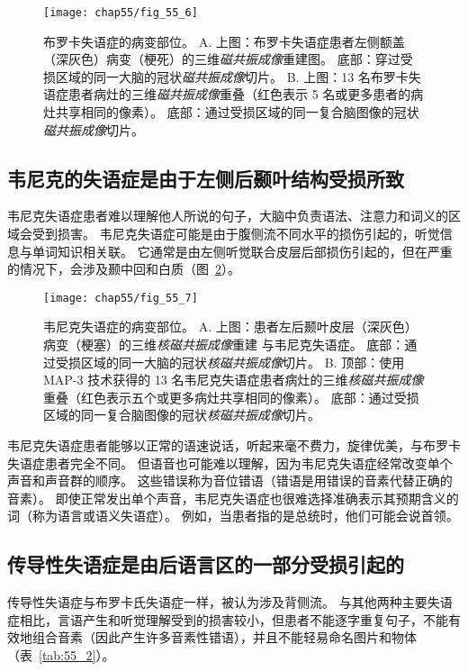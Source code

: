 \begin{figure}[htbp]
	\centering
	\texttt{[image: chap55/fig\_55\_6]}
	\caption{布罗卡失语症的病变部位。
		A. 上图：布罗卡失语症患者左侧额盖（深灰色）病变（梗死）的三维\textit{磁共振成像}重建图。
		底部：穿过受损区域的同一大脑的冠状\textit{磁共振成像}切片。
		B. 上图：13 名布罗卡失语症患者病灶的三维\textit{磁共振成像}重叠（红色表示 5 名或更多患者的病灶共享相同的像素）。
		底部：通过受损区域的同一复合脑图像的冠状\textit{磁共振成像}切片。}
	\label{fig:55_6}
\end{figure}



\subsection{韦尼克的失语症是由于左侧后颞叶结构受损所致}

韦尼克失语症患者难以理解他人所说的句子，大脑中负责语法、注意力和词义的区域会受到损害。
韦尼克失语症可能是由于腹侧流不同水平的损伤引起的，听觉信息与单词知识相关联。
它通常是由左侧听觉联合皮层后部损伤引起的，但在严重的情况下，会涉及颞中回和白质（图~\ref{fig:55_7}）。


\begin{figure}[htbp]
	\centering
	\texttt{[image: chap55/fig\_55\_7]}
	\caption{韦尼克失语症的病变部位。
		A. 上图：患者左后颞叶皮层（深灰色）病变（梗塞）的三维\textit{核磁共振成像}重建 与韦尼克失语症。
		底部：通过受损区域的同一大脑的冠状\textit{核磁共振成像}切片。
		B. 顶部：使用 MAP-3 技术获得的 13 名韦尼克失语症患者病灶的三维\textit{核磁共振成像}重叠（红色表示五个或更多病灶共享相同的像素）。
		底部：通过受损区域的同一复合脑图像的冠状\textit{核磁共振成像}切片。}
	\label{fig:55_7}
\end{figure}


韦尼克失语症患者能够以正常的语速说话，听起来毫不费力，旋律优美，与布罗卡失语症患者完全不同。
但语音也可能难以理解，因为韦尼克失语症经常改变单个声音和声音群的顺序。
这些错误称为音位错语（错语是用错误的音素代替正确的音素）。
即使正常发出单个声音，韦尼克失语症也很难选择准确表示其预期含义的词（称为语言或语义失语症）。
例如，当患者指的是总统时，他们可能会说首领。


\subsection{传导性失语症是由后语言区的一部分受损引起的}

传导性失语症与布罗卡氏失语症一样，被认为涉及背侧流。
与其他两种主要失语症相比，言语产生和听觉理解受到的损害较小，但患者不能逐字重复句子，不能有效地组合音素（因此产生许多音素性错语），并且不能轻易命名图片和物体（表~\ref{tab:55_2}）。


